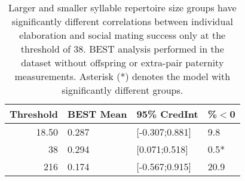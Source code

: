 \documentclass{article}
\begin{document}
  
  \begin{table}[H]
  \centering
  \caption{Larger and smaller syllable repertoire size groups have significantly different correlations between individual elaboration and social mating success only at the threshold of 38.  BEST analysis performed in the dataset without offspring or extra-pair paternity measurements.  Asterisk (*) denotes the model with significantly different groups.} 
  \begin{tabular}{rlll}
  \hline
  Threshold & BEST Mean & 95\% CredInt & \%$<$0 \\ 
  \hline
  18.50 & 0.287 & [-0.307;0.881] & 9.8 \\ 
  38 & 0.294 & [0.071;0.518] & 0.5* \\ 
  216 & 0.174 & [-0.567;0.915] & 20.9 \\ 
  \hline
  \end{tabular}
  \end{table}
  
  
\end{document}
